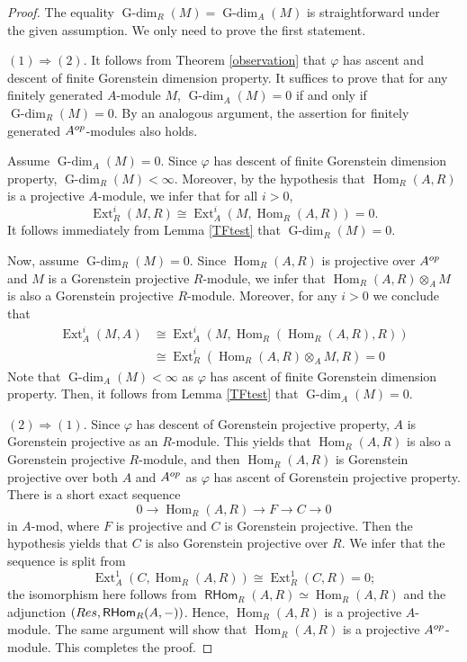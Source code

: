 \documentclass{amsart}
\newcommand{\0}{{\bf{0}}}
\DeclareMathOperator{\Gdim}{G-dim}
\DeclareMathOperator{\Hom}{Hom}
\DeclareMathOperator{\Ext}{Ext}
\DeclareMathOperator{\RHom}{\mathsf{RHom}}
\theoremstyle{definition}
\begin{document}
\begin{proof}
The equality $\Gdim_R(M)=\Gdim_A(M)$ is straightforward under the given assumption. We only need to prove the first statement.

$(1)\Rightarrow (2)$. It follows from Theorem \ref{observation} that $\varphi$ has ascent and descent of finite Gorenstein dimension property. It suffices to prove that for any finitely generated $A$-module $M$, $\Gdim_A(M)=0$ if and only if $\Gdim_R(M)=0$.
By an analogous argument, the assertion for finitely generated $A^{\rm op}$-modules also holds.

Assume $\Gdim_A(M)=0$. Since $\varphi$ has descent of finite Gorenstein dimension property, $\Gdim_R(M)<\infty$. Moreover, by the hypothesis that $\Hom_R(A,R)$ is a projective  $A$-module, we infer that for all $i>0$,
$$\Ext_R^i(M,R)\cong \Ext_A^i(M,\Hom_R(A,R)) = 0.$$
It follows immediately from Lemma \ref{TFtest} that $\Gdim_R(M)=0$. 


Now, assume $\Gdim_R(M)=0$. Since $\Hom_R(A,R)$ is projective over $A^{\rm op}$ and $M$ is a Gorenstein projective $R$-module, we infer that $\Hom_R(A,R)\otimes_A M$ is also a Gorenstein projective $R$-module. Moreover, for any $i>0$ we conclude that
\begin{align*}
  \Ext^i_A(M, A)&\cong \Ext^i_A(M,\Hom_R(\Hom_R(A,R),R))\\
    &\cong \Ext_R^i(\Hom_R(A,R)\otimes_A M, R) = 0
\end{align*}
Note that $\Gdim_A(M)<\infty$ as $\varphi$ has ascent of finite Gorenstein dimension property. Then, it follows from Lemma \ref{TFtest} that $\Gdim_A(M)=0$. 


$(2)\Rightarrow (1)$. Since $\varphi$ has descent of Gorenstein projective property, $A$ is Gorenstein projective as an $R$-module. This yields that $\Hom_R(A,R)$ is also a Gorenstein projective $R$-module, and then $\Hom_R(A,R)$ is Gorenstein projective over both $A$ and $A^{\rm op}$ as $\varphi$ has ascent of Gorenstein projective property. There is a short exact sequence
$$0\rightarrow \Hom_R(A,R)\rightarrow F\rightarrow C\rightarrow 0$$
in $A\mbox{-mod}$, where $F$ is projective and $C$ is Gorenstein projective. Then the hypothesis yields that $C$ is also Gorenstein projective over $R$. We infer that the sequence is split from
$$\Ext^1_A(C,\Hom_R(A,R)) \cong  \Ext^1_R(C,R) = 0;$$
the isomorphism here follows from $\RHom_R(A,R)\simeq \Hom_R(A,R)$ and the adjunction $({\rm Res}, \RHom_R(A,-))$.
Hence, $\Hom_R(A,R)$ is a projective  $A$-module. The same argument will show that $\Hom_R(A,R)$ is a projective $A^{\rm op}$-module.
This completes the proof.
\end{proof}
\end{document}
